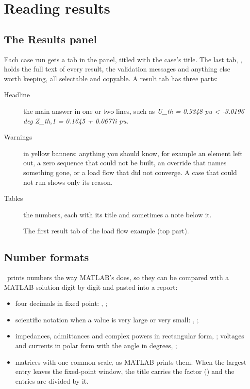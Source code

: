 \chapter{Reading results}\label{ch:results}

\section{The Results panel}

Each case run gets a tab in the  panel, titled with the case's title. The
last tab, , holds the full text of every result, the validation messages and
anything else worth keeping, all selectable and copyable. A result tab has three parts:

\begin{description}
  \item[Headline] the main answer in one or two lines, such as \emph{U\_th = 0.9348 pu <
    -3.0196 deg   Z\_th,1 = 0.1645 + 0.0677i pu}.
  \item[Warnings] in yellow banners: anything you should know, for example an element left
    out, a zero sequence that could not be built, an override that names something gone,
    or a load flow that did not converge. A case that could not run shows only its reason.
  \item[Tables] the numbers, each with its title and sometimes a note below it.
\end{description}

\begin{figure}[H]
  \centering{}
  \caption{The first result tab of the load flow example (top part).}
\end{figure}

\section{Number formats}

\app\ prints numbers the way MATLAB's  does, so they can be compared
with a MATLAB solution digit by digit and pasted into a report:

\begin{itemize}
  \item four decimals in fixed point: , ;
  \item scientific notation when a value is very large or very small: ,
    ;
  \item impedances, admittances and complex powers in rectangular form,
    ; voltages and currents in polar form with the angle in
    degrees, ;
  \item matrices with one common scale, as MATLAB prints them. When the largest entry
    leaves the fixed-point window, the title carries the factor () and the
    entries are divided by it.
\end{itemize}


